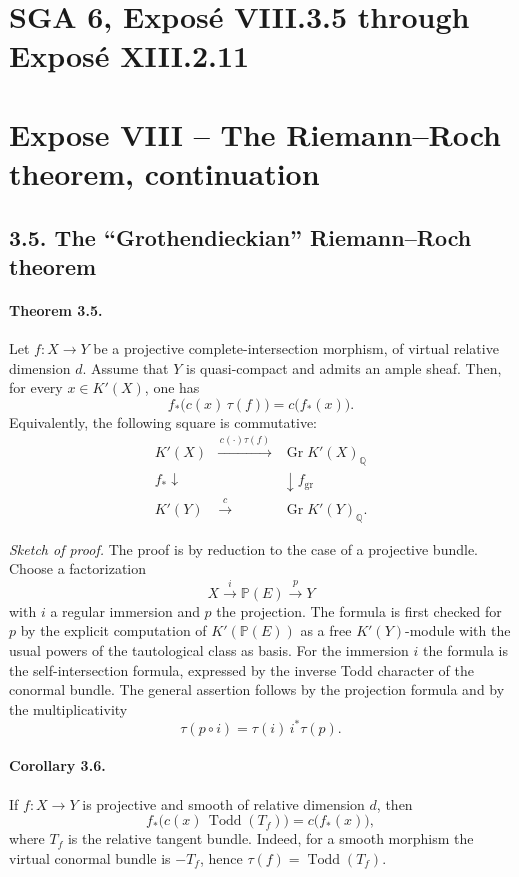 \documentclass[11pt]{article}
\theoremstyle{plain}
\theoremstyle{definition}
\theoremstyle{remark}
\newcommand{\bP}{\mathbb P}
\newcommand{\QQ}{\mathbb Q}
\DeclareMathOperator{\Gr}{Gr}
\providecommand{\xto}[1]{\xrightarrow{#1}}
\providecommand{\Todd}{\operatorname{Todd}}
\begin{document}
\clearpage
\section*{SGA 6, Exposé VIII.3.5 through Exposé XIII.2.11}

\section*{Expose VIII -- The Riemann--Roch theorem, continuation}

\subsection*{3.5. The ``Grothendieckian'' Riemann--Roch theorem}

\paragraph{Theorem 3.5.}
Let $f:X\to Y$ be a projective complete-intersection morphism, of virtual relative dimension $d$. Assume that $Y$ is quasi-compact and admits an ample sheaf. Then, for every $x\in K'(X)$, one has
\[
 f_*\bigl(c(x)\,\tau(f)\bigr)=c\bigl(f_*(x)\bigr).
\]
Equivalently, the following square is commutative:
\[
\begin{array}{ccc}
K'(X) & \xto{\,c(\cdot)\tau(f)\,} & \Gr K'(X)_\QQ \\
\scriptstyle f_*\downarrow && \downarrow\scriptstyle f_{\mathrm{gr}} \\
K'(Y) & \xto{\,c\,} & \Gr K'(Y)_\QQ .
\end{array}
\]

\emph{Sketch of proof.}
The proof is by reduction to the case of a projective bundle. Choose a factorization
\[
X\xto{i}\bP(E)\xto{p}Y
\]
with $i$ a regular immersion and $p$ the projection. The formula is first checked for $p$ by the explicit computation of $K'(\bP(E))$ as a free $K'(Y)$-module with the usual powers of the tautological class as basis. For the immersion $i$ the formula is the self-intersection formula, expressed by the inverse Todd character of the conormal bundle. The general assertion follows by the projection formula and by the multiplicativity
\[
\tau(p\circ i)=\tau(i)\,i^*\tau(p).
\]

\paragraph{Corollary 3.6.}
If $f:X\to Y$ is projective and smooth of relative dimension $d$, then
\[
 f_*\bigl(c(x)\,\Todd(T_f)\bigr)=c\bigl(f_*(x)\bigr),
\]
where $T_f$ is the relative tangent bundle. Indeed, for a smooth morphism the virtual conormal bundle is $-T_f$, hence $\tau(f)=\Todd(T_f)$.
\end{document}
